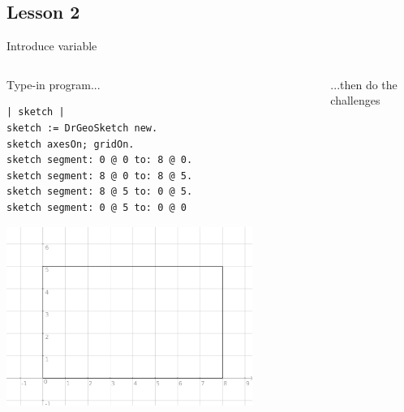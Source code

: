\documentclass{beamer}
\begin{document}
\subsection{Lesson 2}
\begin{frame}[fragile]{Introduce variable\cite{lesson2}}
\begin{columns}[t]
  \begin{column}{0.5\textwidth}
    Type-in program...    
    \vspace*{10pt}
    \fontsize{9pt}{8pt}\selectfont
      \begin{lstlisting}[language=Smalltalk]
| sketch |
sketch := DrGeoSketch new.
sketch axesOn; gridOn.
sketch segment: 0 @ 0 to: 8 @ 0.
sketch segment: 8 @ 0 to: 8 @ 5.
sketch segment: 8 @ 5 to: 0 @ 5.
sketch segment: 0 @ 5 to: 0 @ 0
\end{lstlisting}
      \includegraphics[width=0.8\textwidth]{lesson2.png}
\end{column}
\begin{column}{0.5\textwidth}
  ...then do the challenges 

\end{column}
\end{columns}
\end{frame}
\end{document}
